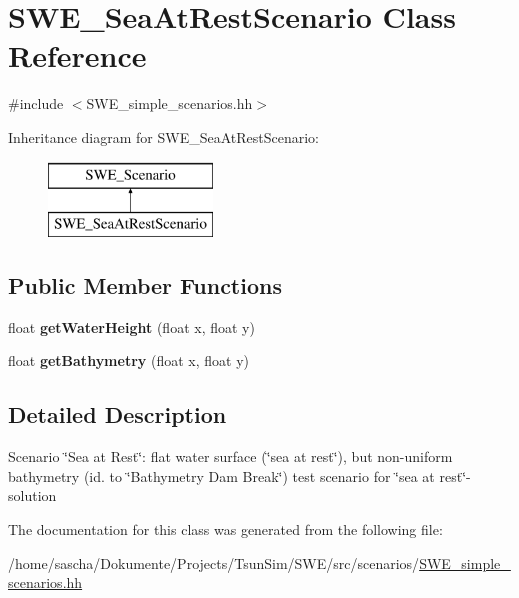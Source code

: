 \hypertarget{classSWE__SeaAtRestScenario}{\section{S\-W\-E\-\_\-\-Sea\-At\-Rest\-Scenario Class Reference}
\label{classSWE__SeaAtRestScenario}
}


{\ttfamily \#include $<$S\-W\-E\-\_\-simple\-\_\-scenarios.\-hh$>$}

Inheritance diagram for S\-W\-E\-\_\-\-Sea\-At\-Rest\-Scenario\-:\begin{figure}[H]
\begin{center}
\leavevmode
\includegraphics[height=2.000000cm]{classSWE__SeaAtRestScenario}
\end{center}
\end{figure}
\subsection*{Public Member Functions}
\begin{DoxyCompactItemize}
\item 
\hypertarget{classSWE__SeaAtRestScenario_a0d493a2c96cde62cc71035c5f62717d1}{float {\bfseries get\-Water\-Height} (float x, float y)}\label{classSWE__SeaAtRestScenario_a0d493a2c96cde62cc71035c5f62717d1}

\item 
\hypertarget{classSWE__SeaAtRestScenario_a738776f758bb5b914ede2e6f57cb3ffd}{float {\bfseries get\-Bathymetry} (float x, float y)}\label{classSWE__SeaAtRestScenario_a738776f758bb5b914ede2e6f57cb3ffd}

\end{DoxyCompactItemize}


\subsection{Detailed Description}
Scenario \char`\"{}\-Sea at Rest\char`\"{}\-: flat water surface (\char`\"{}sea at rest\char`\"{}), but non-\/uniform bathymetry (id. to \char`\"{}\-Bathymetry Dam Break\char`\"{}) test scenario for \char`\"{}sea at rest\char`\"{}-\/solution 

The documentation for this class was generated from the following file\-:\begin{DoxyCompactItemize}
\item 
/home/sascha/\-Dokumente/\-Projects/\-Tsun\-Sim/\-S\-W\-E/src/scenarios/\hyperlink{SWE__simple__scenarios_8hh}{S\-W\-E\-\_\-simple\-\_\-scenarios.\-hh}\end{DoxyCompactItemize}
